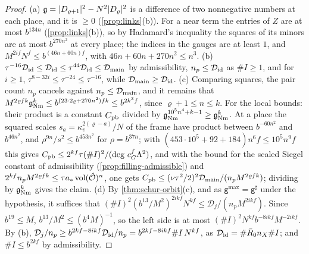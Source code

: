 \begin{proof}
(a) $\mathfrak g=\lvert D_{\varrho+1}\rvert^2-N^2\lvert D_\varrho\rvert^2$ is a difference of two nonnegative numbers at each place, and it is $\ge0$ (\cref{prop:links}(b)). For a near term the entries of $Z$ are at most $b^{134n}$
(\cref{prop:links}(b)), so by Hadamard's inequality the squares of its minors are at most $b^{270n^2}$ at every place; the indices in the gauges are at least $1$, and $M^{2if}N^f\le b^{(46n+60n)f}$, with
$46n+60n+270n^2\le n^3$. (b) $\tau^{-16}\mathcal D_{\rm id}\le\mathcal D_{\rm id}\le\tau^{44}\mathcal D_{\rm id}\le\mathcal D_{\rm main}$ by admissibility, $n_p\le\mathcal D_{\rm id}$ as $\#I\ge1$, and for $i\ge1$, $\tau^{8-32i}\le\tau^{-24}\le\tau^{-16}$,
while $\mathcal D_{\rm main}\ge\mathcal D_{\rm id}$.
(c) Comparing squares, the pair count $n_p$ cancels against $n_p\le\mathcal D_{\rm main}$, and it remains that $M^{2\varrho fk}\mathfrak g_{\rm Nm}^k\le b^{(23\cdot2\varrho+270n^2)fk}\le b^{2k^3f}$, since $\varrho+1\le n\le k$. For the
local bounds: their product is a constant $C_{\rm pb}$ divided by $\mathfrak g_{\rm Nm}^{10^5n^4+k-1}\ge\mathfrak g_{\rm Nm}^k$. At a place the squared scales $s_a=\kappa_v^{2(\varrho-a)}/N$ of the frame have product between $b^{-60n^2}$ and
$b^{46n^2}$, and $\rho^{9n}/s^2\le b^{453n^2}$ for $\rho=b^{37n}$; with $(453\cdot10^5+92+184)n^6f\le10^5n^9f$ this gives
$C_{\rm pb}\le2^{kf}\tau(\#I)^2/(\deg\,c_G^f\Lambda^2)$, and with the bound for the scaled Siegel constant of admissibility (\cref{prop:filling-admissible}) and $2^{kf}n_pM^{2\varrho fk}\le\tau a_*\operatorname{vol}(\hat{\mathcal{O}})^n$, one gets
$C_{\rm pb}\le(\nu\tau^2/2)^2\mathcal D_{\rm main}/(n_pM^{2\varrho fk})$; dividing by $\mathfrak g_{\rm Nm}^k$ gives the claim.
(d) By \cref{thm:schur-orbit}(c), and as $\mathsf g^{\max}=\mathsf g^\sharp$ under the hypothesis, it suffices that $(\#I)^2(b^{13}/M^2)^{2ikf}N^{kf}\le\mathcal D_j/(n_pM^{2ikf})$. Since $b^{19}\le M$, $b^{13}/M^2\le(b^4M)^{-1}$, so the left side
is at most $(\#I)^2N^{kf}b^{-8ikf}M^{-2ikf}$. By (b), $\mathcal D_j/n_p\ge b^{2kf-8ikf}\mathcal D_{\rm id}/n_p=b^{2kf-8ikf}\#I\,N^{kf}$, as $\mathcal D_{\rm id}=\#\bar R_0n_X\#I$; and $\#I\le b^{2kf}$ by admissibility.
\end{proof}

